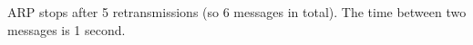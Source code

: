 ARP stops after 5 retransmissions (so 6 messages in total). The time between two messages is 1 second.